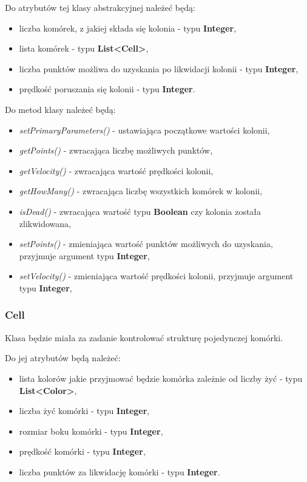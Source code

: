\documentclass[a4paper]{article}
\begin{document}
Do atrybut\'ow tej klasy abstrakcyjnej nale\.ze\'c b\k{e}d\k{a}:
\begin{itemize}
    \item liczba kom\'orek, z jakiej sk\l{}ada si\k{e} kolonia - typu \textbf{Integer},
    \item lista kom\'orek - typu \textbf{List<Cell>},
    \item liczba punkt\'ow mo\.zliwa do uzyskania po likwidacji kolonii - typu \textbf{Integer},
    \item pr\k{e}dko\'s\'c poruszania si\k{e} kolonii - typu \textbf{Integer}.
\end{itemize}

Do metod klasy nale\.ze\'c b\k{e}d\k{a}:
\begin{itemize}
    \item \textit{setPrimaryParameters()} - ustawiaj\k{a}ca pocz\k{a}tkowe warto\'sci kolonii,
    \item \textit{getPoints()} - zwracaj\k{a}ca liczb\k{e} mo\.zliwych punkt\'ow,
    \item \textit{getVelocity()} - zwracaj\k{a}ca warto\'s\'c pr\k{e}dko\'sci kolonii,
    \item \textit{getHowMany()} - zwracaj\k{a}ca liczb\k{e} wszystkich kom\'orek w kolonii,
    \item \textit{isDead()} - zwracaj\k{a}ca warto\'s\'c typu \textbf{Boolean} czy kolonia zosta\l{}a zlikwidowana,
    \item \textit{setPoints()} - zmieniaj\k{a}ca warto\'s\'c punkt\'ow mo\.zliwych do uzyskania, przyjmuje argument typu \textbf{Integer},
    \item \textit{setVelocity()} - zmieniaj\k{a}ca warto\'s\'c pr\k{e}dko\'sci kolonii, przyjmuje argument typu \textbf{Integer},
\end{itemize}

\subsubsection{Cell}

\quad     Klasa b\k{e}dzie mia\l{}a za zadanie kontrolowa\'c struktur\k{e} pojedynczej kom\'orki.

Do jej atrybut\'ow b\k{e}d\k{a} nale\.ze\'c:

\begin{itemize}
    \item lista kolor\'ow jakie przyjmowa\'c b\k{e}dzie kom\'orka zale\.znie od liczby \.zy\'c - typu \textbf{List<Color>},
    \item liczba \.zy\'c kom\'orki - typu \textbf{Integer},
    \item rozmiar boku kom\'orki - typu \textbf{Integer},
    \item pr\k{e}dko\'s\'c kom\'orki - typu \textbf{Integer},
    \item liczba punkt\'ow za likwidacj\k{e} kom\'orki - typu \textbf{Integer}. 
\end{itemize}
\end{document}
